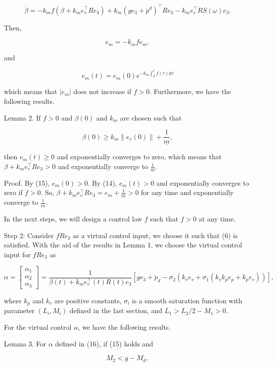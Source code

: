 \documentclass[10pt]{article}
\begin{document}
$$
\dot{\beta}=-k_{m} f\left(\beta+k_{m} e_{v}^{\top} R e_{3}\right)+k_{m}\left(g e_{3}+\ddot{p}^{d}\right)^{\top} R e_{3}-k_{m} e_{v}^{\top} R S(\omega) e_{3} .
$$

Then,

$$
\dot{e}_{m}=-k_{m} f e_{m},
$$

and

$$
e_{m}(t)=e_{m}(0) e^{-k_{m} \int_{0}^{t} f(\tau) d \tau}
$$

which means that $\left|e_{m}\right|$ does not increase if $f>0$. Furthermore, we have the following results.

Lemma 2. If $f>0$ and $\beta(0)$ and $k_{m}$ are chosen such that

$$
\beta(0) \geq k_{m}\left\|e_{v}(0)\right\|+\frac{1}{\underline{m}},
$$

then $e_{m}(t) \geq 0$ and exponentially converges to zero, which means that $\beta+k_{m} e_{v}^{\top} R e_{3}>0$ and exponentially converge to $\frac{1}{m}$.

Proof. By (15), $e_{m}(0)>0$. By (14), $e_{m}(t)>0$ and exponentially converges to zero if $f>0$. So, $\beta+k_{m} e_{v}^{\top} R e_{3}=e_{m}+\frac{1}{m}>0$ for any time and exponentially converge to $\frac{1}{m}$.

In the next steps, we will design a control law $f$ such that $f>0$ at any time.

Step 2: Consider $f R e_{3}$ as a virtual control input, we choose it such that (6) is satisfied. With the aid of the results in Lemma 1, we choose the virtual control input for $f R e_{3}$ as

$$
\alpha=\left[\begin{array}{l}
\alpha_{1} \\
\alpha_{2} \\
\alpha_{3}
\end{array}\right]=\frac{1}{\beta(t)+k_{m} e_{v}^{\top}(t) R(t) e_{3}}\left[g e_{3}+\ddot{p}_{d}-\sigma_{2}\left(k_{v} e_{v}+\sigma_{1}\left(k_{v} k_{p} e_{p}+k_{p} e_{v}\right)\right)\right],
$$

where $k_{p}$ and $k_{v}$ are positive constants, $\sigma_{i}$ is a smooth saturation function with parameter $\left(L_{i}, M_{i}\right)$ defined in the last section, and $L_{1}>L_{2} / 2-M_{1}>0$.

For the virtual control $\alpha$, we have the following results.

Lemma 3. For $\alpha$ defined in (16), if (15) holds and

$$
M_{2}<g-M_{d},
$$
\end{document}
